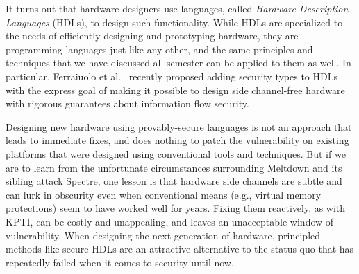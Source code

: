 \documentclass[11pt,twoside]{scrartcl}
\begin{document}
It turns out that hardware designers use languages, called \emph{Hardware Description Languages} (HDLs), to design such functionality. While HDLs are specialized to the needs of efficiently designing and prototyping hardware, they are programming languages just like any other, and the same principles and techniques that we have discussed all semester can be applied to them as well. In particular, Ferraiuolo et al.~\cite{Ferraiuolo2017} recently proposed adding security types to HDLs with the express goal of making it possible to design side channel-free hardware with rigorous guarantees about information flow security. 

Designing new hardware using provably-secure languages is not an approach that leads to immediate fixes, and does nothing to patch the vulnerability on existing platforms that were designed using conventional tools and techniques. But if we are to learn from the unfortunate circumstances surrounding Meltdown and its sibling attack Spectre, one lesson is that hardware side channels are subtle and can lurk in obscurity even when conventional means (e.g., virtual memory protections) seem to have worked well for years. Fixing them reactively, as with KPTI, can be costly and unappealing, and leaves an unacceptable window of vulnerability. When designing the next generation of hardware, principled methods like secure HDLs are an attractive alternative to the status quo that has repeatedly failed when it comes to security until now.


\end{document}
